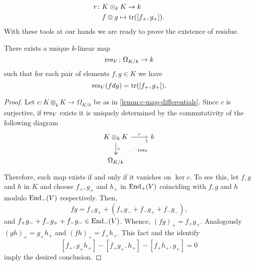 \begin{align*}
	r\colon &K\otimes_{k} K \to k \\
	&f \otimes g \mapsto \operatorname{tr}([f_{+}, g_{+}]).
\end{align*}
With these tools at our hands we are ready to prove the existence of residue.
\begin{theorem}\label{thm:existence-of-residue}
	There exists a unique $k$-linear map
	\[
		\operatorname{res}_{V}\colon \Omega_{K/k}\to k
	\]
	such that for each pair of elements $f,g \in K$ we have
	\[
		\operatorname{res}_{V}(fdg) = \operatorname{tr}([f_{+}, g_{+}]).
	\]
\end{theorem}
\begin{proof}
	Let $c\colon K \otimes_{k} K \to \Omega_{K/k}$ be as in \cref{lemm:c-map-differentials}. Since $c$ is surjective, if $\operatorname{res}_{V}$ exists it is uniquely determined by the commutativity of the following diagram
	\[
	\begin{tikzcd}
		K \otimes_{k} K \arrow[r, "r"] \arrow[d, two heads, "c"] & k \\
		\Omega_{K/k} \arrow[ur, dotted, swap, "\res_{V}"] &
	\end{tikzcd}
	\]
	Therefore, such map exists if and only if it vanishes on $\ker c$. To see this, let $f,g$ and $h$ in $K$ and choose $f_{+}, g_{+}$ and $h_{+}$ in $\operatorname{End}_{+}(V)$ coinciding with $f, g$ and $h$ modulo $\operatorname{End}_{-}(V)$ respectively. Then,
	\[
		fg = f_{+}g_{+} + (f_{+}g_{-} + f_{-}g_{+} + f_{-}g_{-}),
	\]
	and $f_{+}g_{-} + f_{-}g_{+} + f_{-}g_{-} \in \operatorname{End}_{-}(V)$. Whence, $(fg)_{+} = f_{+}g_{+}$. Analogously $(gh)_{+} = g_{+}h_{+}$ and $(fh)_{+} = f_{+}h_{+}$. This fact and the identify
	\[
		[f_{+},g_{+}h_{+}] - [f_{+}g_{+}, h_{+}] - [f_{+}h_{+}, g_{+}] = 0
	\]
	imply the desired conclusion.
\end{proof}
